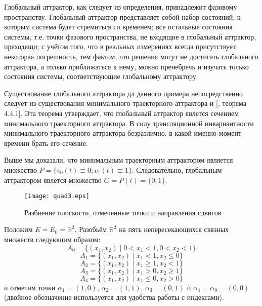 Глобальный аттрактор, как следует из определения, принадлежит фазовому пространству.
Глобальный аттрактор представляет собой набор состояний, к которым система будет стремиться со временем;
все остальные состояния системы, т.е. точки фазового пространства, не входящие в глобальный аттрактор, преходящи;
с учётом того, что в реальных измерениях всегда присутствует некоторая погрешность, тем фактом, что решения могут не достигать глобального аттрактора, а только приближаться к нему, можно пренебречь и изучать только состояния системы, соответствующие глобальному аттрактору.

Существование глобального аттрактора дл данного примера непосредственно следует из существования
минимального траекторного аттрактора и [\cite{Zelenaya}, теорема 4.4.1].
Эта теорема утверждает, что глобальный аттрактор явлется сечением минимального траекторного аттрактора.
В силу трансляционной инвариантности минимального траекторного аттрактора безразлично,
в какой именно момент времени брать его сечение.

Выше мы доказали, что минимальным траекторным аттрактором является множество $P=\{v_0(t)\equiv 0; v_1(t)\equiv 1\}$.
Следовательно, глобальным аттрактором явлется множество $G = P(t) = \{0; 1\}$.



\begin{figure}
	\texttt{[image: quad3.eps]}
	\caption{Разбиение плоскости, отмеченные точки и направления сдвигов}
	\label{fig:somelabel}
\end{figure}

Положим $E=E_0=\mathbb{R}^2$.
Разобьём $\mathbb{R}^2$ на пять непересекающихся связных множеств следующим образом:
$$
	A_0 = \{ (x_1, x_2) \mid 0 < x_1 < 1, 0 < x_2 < 1\}
$$
$$
	A_1 = \{ (x_1, x_2) \mid x_1 < 1, x_2 \leq 0  \}
$$
$$
	A_2 = \{ (x_1, x_2) \mid x_1 \geq 1, x_2 < 1  \}
$$
$$
	A_3 = \{ (x_1, x_2) \mid x_1 > 0, x_2 \geq 1  \}
$$
$$
	A_4 = \{ (x_1, x_2) \mid x_1 \leq 0, x_2 > 0  \}
$$
и отметим точки
$\alpha_1=(1, 0)$,
$\alpha_2=(1, 1)$,
$\alpha_3=(0, 1)$ и
$\alpha_4=\alpha_0=(0, 0)$
(двойное обозначение используется для удобства работы с индексами).

